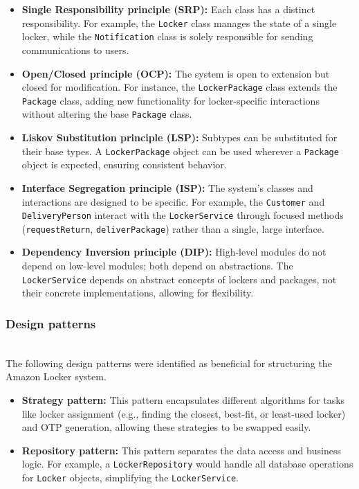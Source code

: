 \begin{itemize}
\item
\protect{}\label{ubbXRC2GFz78FD7jAU0JG}
\textbf{Single Responsibility principle (SRP):} Each class has a distinct responsibility. For example, the \texttt{Locker} class manages the state of a single locker, while the \texttt{Notification} class is solely responsible for sending communications to users.
\item
\protect{}\label{YJMTBqU7cQmWzo1oX48VU}
\textbf{Open/Closed principle (OCP):} The system is open to extension but closed for modification. For instance, the \texttt{LockerPackage} class extends the \texttt{Package} class, adding new functionality for locker-specific interactions without altering the base \texttt{Package} class.
\item
\protect{}\label{uCm0EeOpWkEF2EnRJKSVn}
\textbf{Liskov Substitution principle (LSP):} Subtypes can be substituted for their base types. A \texttt{LockerPackage} object can be used wherever a \texttt{Package} object is expected, ensuring consistent behavior.
\item
\protect{}\label{IXfF-VDbSrIjgPt9mxmyt}
\textbf{Interface Segregation principle (ISP):} The system's classes and interactions are designed to be specific. For example, the \texttt{Customer} and \texttt{DeliveryPerson} interact with the \texttt{LockerService} through focused methods (\texttt{requestReturn}, \texttt{deliverPackage}) rather than a single, large interface.
\item
\protect{}\label{cnGhegMINR8hPulxmFjQL}
\textbf{Dependency Inversion principle (DIP):} High-level modules do not depend on low-level modules; both depend on abstractions. The \texttt{LockerService} depends on abstract concepts of lockers and packages, not their concrete implementations, allowing for flexibility.
\end{itemize}

\subsubsection{Design patterns}\label{L0pnwcnpFb7ffabwS2jIt}
\\
The following design patterns were identified as beneficial for structuring the Amazon Locker system.

\begin{itemize}
\item
\protect{}\label{VtnZdcHwhHd1fk1sq3O4d}
\textbf{Strategy pattern:} This pattern encapsulates different algorithms for tasks like locker assignment (e.g., finding the closest, best-fit, or least-used locker) and OTP generation, allowing these strategies to be swapped easily.
\item
\protect{}\label{uI41oJxCaoneAVMx0CTf3}
\textbf{Repository pattern:} This pattern separates the data access and business logic. For example, a \texttt{LockerRepository} would handle all database operations for \texttt{Locker} objects, simplifying the \texttt{LockerService}.
\end{itemize}

